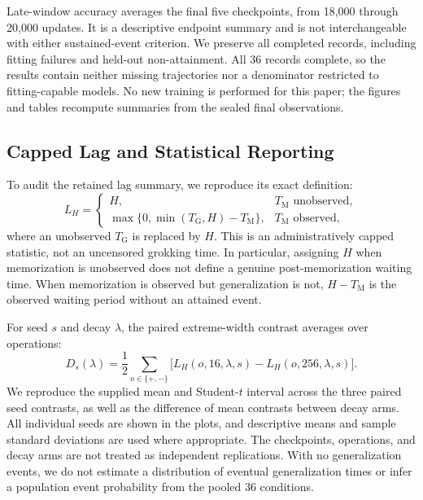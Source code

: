 \documentclass{article}
\newcommand{\TM}{T_{\mathrm{M}}}
\newcommand{\TG}{T_{\mathrm{G}}}
\newcommand{\LH}{L_H}
\begin{document}
Late-window accuracy averages the final five checkpoints, from 18,000 through 20,000 updates. It is a descriptive endpoint summary and is not interchangeable with either sustained-event criterion. We preserve all completed records, including fitting failures and held-out non-attainment. All 36 records complete, so the results contain neither missing trajectories nor a denominator restricted to fitting-capable models. No new training is performed for this paper; the figures and tables recompute summaries from the sealed final observations.

\subsection{Capped Lag and Statistical Reporting}
\label{sec:lag}

To audit the retained lag summary, we reproduce its exact definition:
\begin{equation}
\LH=\begin{cases}
H,&\TM\text{ unobserved},\\
\max\{0,\min(\TG,H)-\TM\},&\TM\text{ observed},
\end{cases}
\label{eq:lag}
\end{equation}
where an unobserved $\TG$ is replaced by $H$. This is an administratively capped statistic, not an uncensored grokking time. In particular, assigning $H$ when memorization is unobserved does not define a genuine post-memorization waiting time. When memorization is observed but generalization is not, $H-\TM$ is the observed waiting period without an attained event.

For seed $s$ and decay $\lambda$, the paired extreme-width contrast averages over operations:
\begin{equation}
D_s(\lambda)=\frac{1}{2}\sum_{o\in\{+, -\}}
\big[\LH(o,16,\lambda,s)-\LH(o,256,\lambda,s)\big].
\label{eq:contrast}
\end{equation}
We reproduce the supplied mean and Student-$t$ interval across the three paired seed contrasts, as well as the difference of mean contrasts between decay arms. All individual seeds are shown in the plots, and descriptive means and sample standard deviations are used where appropriate. The checkpoints, operations, and decay arms are not treated as independent replications. With no generalization events, we do not estimate a distribution of eventual generalization times or infer a population event probability from the pooled 36 conditions.
\end{document}
